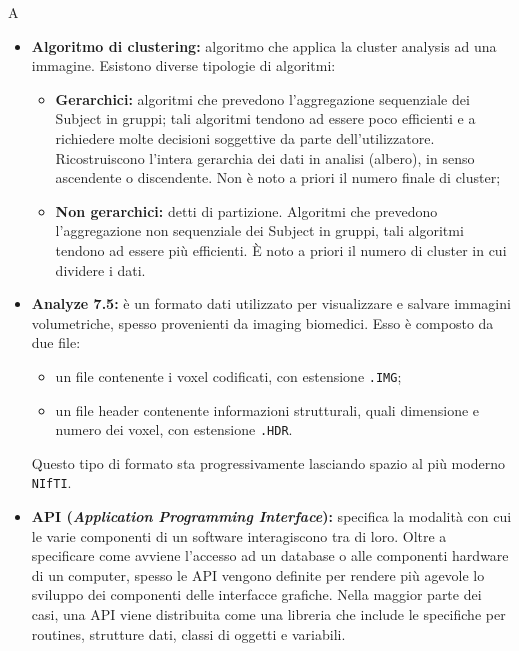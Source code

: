 \Huge A
\normalsize
\begin{itemize}
\item\textbf{Algoritmo di clustering:} algoritmo che applica la cluster analysis\glossario{} ad una immagine. Esistono diverse tipologie di algoritmi:
\begin{itemize}
\item \textbf{Gerarchici:} algoritmi che prevedono l’aggregazione sequenziale dei Subject\glossario{} in gruppi; tali algoritmi tendono ad essere poco efficienti e a richiedere molte decisioni soggettive da parte dell'utilizzatore. Ricostruiscono l'intera gerarchia dei dati in analisi (albero), in senso ascendente o discendente. Non è noto a priori il numero finale di cluster\glossario{};
\item \textbf{Non gerarchici:} detti di partizione. Algoritmi che prevedono l'aggregazione non sequenziale dei Subject\glossario{} in gruppi, tali algoritmi tendono ad essere più efficienti. È noto a priori il numero di cluster\glossario{} in cui dividere i dati. 
\end{itemize}

\item\textbf{Analyze 7.5:} è un formato dati utilizzato per visualizzare e salvare immagini volumetriche, spesso provenienti da imaging biomedici\glossario{}. Esso è composto da due file:
\begin{itemize}
\item un file contenente i voxel\glossario{} codificati, con estensione \verb!.IMG!;
\item un file header contenente informazioni strutturali, quali dimensione e numero dei voxel\glossario{}, con estensione \verb!.HDR!.
\end{itemize}
Questo tipo di formato sta progressivamente lasciando spazio al più moderno \verb!NIfTI!\glossario{}.

\item\textbf{API (\textit{Application Programming Interface}):} specifica la modalità con cui le varie componenti di un software interagiscono tra di loro. Oltre a specificare come avviene l'accesso ad un database o alle componenti hardware di un computer, spesso le API vengono definite per rendere più agevole lo sviluppo dei componenti delle interfacce grafiche. Nella maggior parte dei casi, una API viene distribuita come una libreria che include le specifiche per routines, strutture dati, classi di oggetti e variabili.


\end{itemize}
